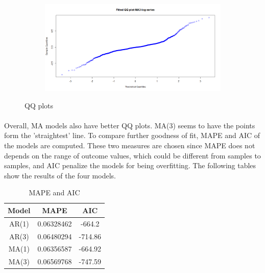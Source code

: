 \documentclass[12pt]{article}
\begin{document}
\begin{figure}[H]
\begin{subfigure}[b]{0.49\linewidth}
  \end{subfigure}
  \begin{subfigure}[b]{0.49\linewidth}
    \includegraphics[width=\linewidth]{figure12-4.png}
  \end{subfigure}
  \caption{QQ plots}
  \label{fig:figure12}
\end{figure}
\paragraph{}
Overall, MA models also have better QQ plots. MA(3) seems to have the points form the 'straightest' line. To compare further goodness of fit, MAPE and AIC of the models are computed. These two measures are chosen since MAPE does not depends on the range of outcome values, which could be different from samples to samples, and AIC penalize the models for being overfitting. The following tables show the results of the four models.

\begin{table}[H]
  \begin{center}
    \caption{MAPE and AIC}
    \label{tab:table1}
    \begin{tabular}{c|c|S} %
      \textbf{Model} & \textbf{MAPE} & \textbf{AIC}\\
      \hline
      AR(1) & 0.06328462 & -664.2\\
      AR(3) & 0.06480294 & -714.86\\
      MA(1) & 0.06356587 & -664.92\\
      MA(3) & 0.06569768 & -747.59\\
    \end{tabular}
  \end{center}
\end{table}
\end{document}
